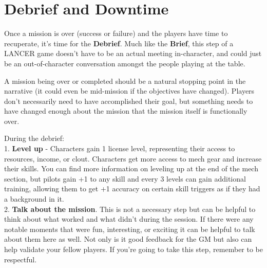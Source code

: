 \section{Debrief and Downtime}

Once a mission is over (success or failure) and the players have time to recuperate, it’s time for the \textbf{Debrief}. Much like the \textbf{Brief}, this step of a LANCER game doesn’t have to be an actual meeting in-character, and could just be an out-of-character conversation amongst the people playing at the table. 

A mission being over or completed should be a natural stopping point in the narrative (it could even be mid-mission if the objectives have changed). Players don’t necessarily need to have accomplished their goal, but something needs to have changed enough about the mission that the mission itself is functionally over. 

During the debrief:\\
1. \textbf{Level up} - Characters gain 1 license level, representing their access to resources, income, or clout. Characters get more access to mech gear and increase their skills. You can find more information on leveling up at the end of the mech section, but pilots gain +1 to any skill and every 3 levels can gain additional training, allowing them to get +1 accuracy on certain skill triggers as if they had a background in it.\\
2. \textbf{Talk about the mission}. This is not a necessary step but can be helpful to think about what worked and what didn’t during the session. If there were any notable moments that were fun, interesting, or exciting it can be helpful to talk about them here as well. Not only is it good feedback for the GM but also can help validate your fellow players. If you’re going to take this step, remember to be respectful. 